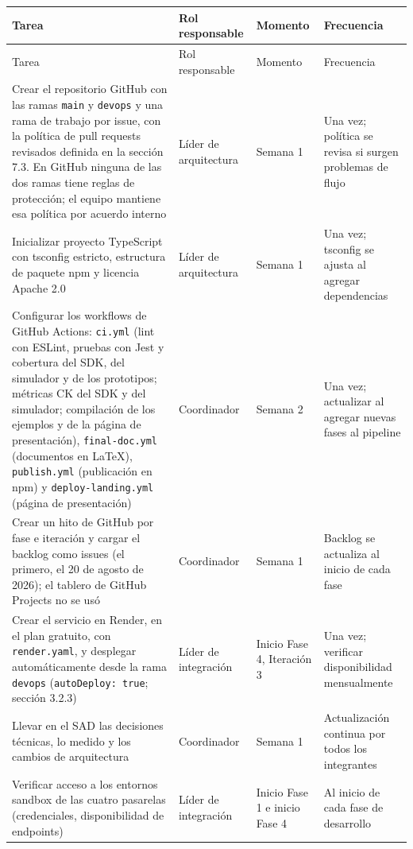 \begin{center}
\renewcommand{\arraystretch}{1.2}
\SinNumero
\begin{longtable}{|P{0.403}|P{0.167}|P{0.174}|P{0.257}|}
  \hline
  Tarea & Rol responsable & Momento & Frecuencia \\
  \hline
  \endfirsthead
  \hline
  Tarea & Rol responsable & Momento & Frecuencia \\
  \hline
  \endhead
  Crear el repositorio GitHub con las ramas \texttt{main} y \texttt{devops} y una rama de trabajo por issue, con la política de pull requests revisados definida en la sección 7.3. En GitHub ninguna de las dos ramas tiene reglas de protección; el equipo mantiene esa política por acuerdo interno & Líder de arquitectura & Semana 1 & Una vez; política se revisa si surgen problemas de flujo \\
  \hline
  Inicializar proyecto TypeScript con tsconfig estricto, estructura de paquete npm y licencia Apache 2.0 & Líder de arquitectura & Semana 1 & Una vez; tsconfig se ajusta al agregar dependencias \\
  \hline
  Configurar los workflows de GitHub Actions: \texttt{ci.yml} (lint con ESLint, pruebas con Jest y cobertura del SDK, del simulador y de los prototipos; métricas CK del SDK y del simulador; compilación de los ejemplos y de la página de presentación), \texttt{final-doc.yml} (documentos en LaTeX), \texttt{publish.yml} (publicación en npm) y \texttt{deploy-landing.yml} (página de presentación) & Coordinador & Semana 2 & Una vez; actualizar al agregar nuevas fases al pipeline \\
  \hline
  Crear un hito de GitHub por fase e iteración y cargar el backlog como issues (el primero, el 20 de agosto de 2026); el tablero de GitHub Projects no se usó & Coordinador & Semana 1 & Backlog se actualiza al inicio de cada fase \\
  \hline
  Crear el servicio en Render, en el plan gratuito, con \texttt{render.yaml}, y desplegar automáticamente desde la rama \texttt{devops} (\texttt{autoDeploy: true}; sección 3.2.3) & Líder de integración & Inicio Fase 4, Iteración 3 & Una vez; verificar disponibilidad mensualmente \\
  \hline
  Llevar en el SAD las decisiones técnicas, lo medido y los cambios de arquitectura & Coordinador & Semana 1 & Actualización continua por todos los integrantes \\
  \hline
  Verificar acceso a los entornos sandbox de las cuatro pasarelas (credenciales, disponibilidad de endpoints) & Líder de integración & Inicio Fase 1 e inicio Fase 4 & Al inicio de cada fase de desarrollo \\

\end{longtable}
\end{center}
